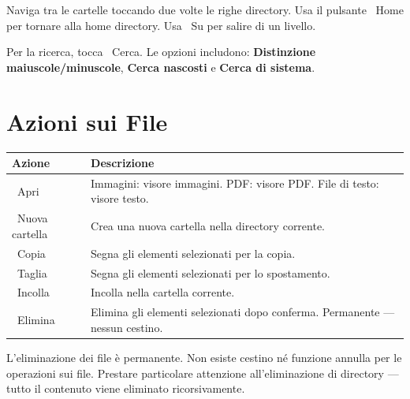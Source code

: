 Naviga tra le cartelle toccando due volte le righe directory.
Usa il pulsante ~Home per tornare alla home directory.
Usa ~Su per salire di un livello.

Per la ricerca, tocca ~Cerca. Le opzioni includono:
\textbf{Distinzione maiuscole/minuscole}, \textbf{Cerca nascosti} e \textbf{Cerca di sistema}.

\section{Azioni sui File}

\begin{longtable}{L{3.6cm}L{10.1cm}}
\toprule
{}
\color{white}\sffamily\bfseries Azione &
\color{white}\sffamily\bfseries Descrizione \\
\midrule
{}~Apri &
  Immagini: visore immagini. PDF: visore PDF. File di testo: visore testo. \\
~Nuova cartella &
  Crea una nuova cartella nella directory corrente. \\
~Copia &
  Segna gli elementi selezionati per la copia. \\
~Taglia &
  Segna gli elementi selezionati per lo spostamento. \\
~Incolla &
  Incolla nella cartella corrente. \\
~Elimina &
  Elimina gli elementi selezionati dopo conferma. Permanente --- nessun cestino. \\
\bottomrule
\end{longtable}

\begin{warningbox}
L'eliminazione dei file è permanente.
Non esiste cestino né funzione annulla per le operazioni sui file.
Prestare particolare attenzione all'eliminazione di directory --- tutto il contenuto
viene eliminato ricorsivamente.
\end{warningbox}
